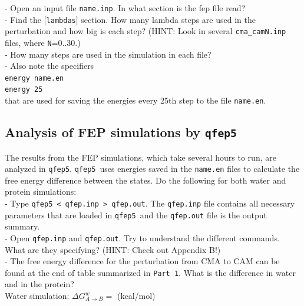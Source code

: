 \documentclass[a4paper,12pt]{article}
\newcommand{\qfep}{\texttt{qfep5}}
\begin{document}
- Open an input file \texttt{name.inp}. In what section is the fep file read?\\

- Find the \texttt{$[$lambdas$]$} section. How many lambda steps
are used in the perturbation and how big is each step? (HINT: Look
in several \texttt{cma\_camN.inp} files, where \texttt{N}=0..30.)\\

- How many steps are used in the simulation in each file?\\

- Also note the specifiers\\

\noindent \texttt{energy \hspace{2cm}             name.en}\\
\texttt{energy  \hspace{2cm}                 25}\\

\noindent that are used for saving the energies every 25th step to
the file \texttt{name.en}.
\newpage

\subsection{Analysis of FEP simulations by \qfep}

The results from the FEP simulations, which take several hours
to run, are analyzed in \qfep. \qfep\ uses energies saved
in the \texttt{name.en} files to calculate the free energy
difference between the states. Do the following for both water and protein simulations:\\

- Type \qfep\ \texttt{< qfep.inp > qfep.out}. The
\texttt{qfep.inp} file contains all necessary parameters that are
loaded in \qfep\ and the \texttt{qfep.out} file is the output summary.\\

- Open \texttt{qfep.inp} and \texttt{qfep.out}. Try to understand the different commands.
What are they specifying? (HINT: Check out Appendix B!)\\

- The free energy difference for the perturbation from CMA to CAM
can be found at the end of table summarized in \texttt{Part 1}.
What is the difference in water and in the protein?\\

Water simulation: $\Delta G_{A \rightarrow B}^w=$ \hspace{2cm} (kcal/mol)\\
\end{document}

